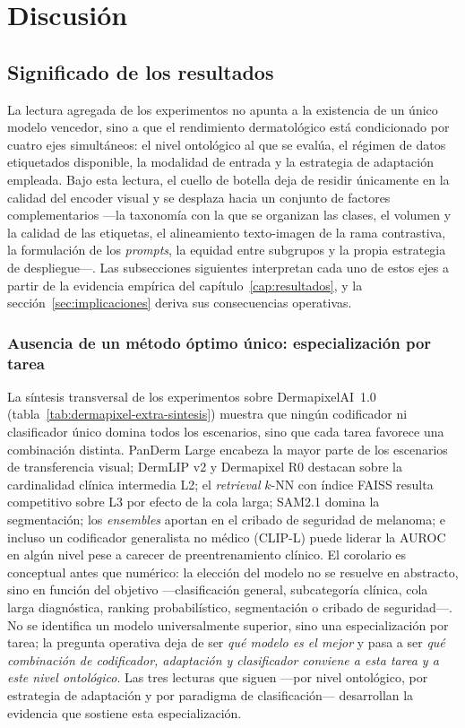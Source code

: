 
\chapter{Discusión}
\label{cap:discusion}

\section{Significado de los resultados}
\label{sec:significado}

La lectura agregada de los experimentos no apunta a la existencia de
un único modelo vencedor, sino a que el rendimiento dermatológico está
condicionado por cuatro ejes simultáneos: el nivel ontológico al que
se evalúa, el régimen de datos etiquetados disponible, la modalidad de
entrada y la estrategia de adaptación empleada. Bajo esta lectura, el
cuello de botella deja de residir únicamente en la calidad del encoder
visual y se desplaza hacia un conjunto de factores complementarios ---la
taxonomía con la que se organizan las clases, el volumen y la calidad de
las etiquetas, el alineamiento texto-imagen de la rama contrastiva, la
formulación de los \emph{prompts}, la equidad entre subgrupos y la propia
estrategia de despliegue---. Las subsecciones siguientes interpretan cada
uno de estos ejes a partir de la evidencia empírica del
capítulo~\ref{cap:resultados}, y la sección~\ref{sec:implicaciones}
deriva sus consecuencias operativas.

\subsection{Ausencia de un método óptimo único: especialización por tarea}
\label{sec:disc-especializacion}

La síntesis transversal de los experimentos sobre DermapixelAI~1.0
(tabla~\ref{tab:dermapixel-extra-sintesis}) muestra que ningún
codificador ni clasificador único domina todos los escenarios, sino que
cada tarea favorece una combinación distinta. PanDerm Large encabeza la
mayor parte de los escenarios de transferencia visual; DermLIP v2 y
Dermapixel R0 destacan sobre la cardinalidad clínica intermedia L2; el
\emph{retrieval} $k$-NN con índice FAISS resulta competitivo sobre L3 por
efecto de la cola larga; SAM2.1 domina la segmentación; los
\emph{ensembles} aportan en el cribado de seguridad de melanoma; e incluso
un codificador generalista no médico (CLIP-L) puede liderar la AUROC en
algún nivel pese a carecer de preentrenamiento clínico. El corolario es
conceptual antes que numérico: la elección del modelo no se resuelve
en abstracto, sino en función del objetivo ---clasificación general,
subcategoría clínica, cola larga diagnóstica, ranking probabilístico,
segmentación o cribado de seguridad---. No se identifica un modelo
universalmente superior, sino una especialización por tarea; la
pregunta operativa deja de ser \emph{qué modelo es el mejor} y pasa a
ser \emph{qué combinación de codificador, adaptación y clasificador
conviene a esta tarea y a este nivel ontológico}. Las tres lecturas
que siguen ---por nivel ontológico, por estrategia de adaptación y por
paradigma de clasificación--- desarrollan la evidencia que sostiene
esta especialización.

